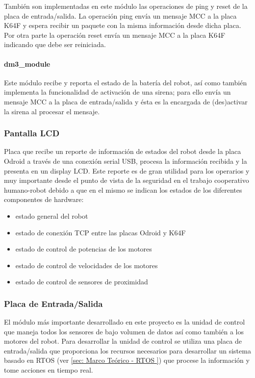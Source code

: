 \documentclass[withindex,glossary]{cam-thesis}
\begin{document}
También son implementadas en este módulo las operaciones de ping y reset de la placa de entrada/salida. La operación ping envía un mensaje MCC a la placa K64F y espera recibir un paquete con la misma información desde dicha placa. Por otra parte la operación reset envía un mensaje MCC a la placa K64F indicando que debe ser reiniciada.

\paragraph{dm3\_module}
Este módulo recibe y reporta el estado de la batería del robot, así como también implementa la funcionalidad de activación de una sirena; para ello envía un mensaje MCC a la placa de entrada/salida y ésta es la encargada de (des)activar la sirena al procesar el mensaje.

\subsubsection{Pantalla LCD}
Placa que recibe un reporte de información de estados del robot desde la placa Odroid a través de una conexión serial USB, procesa la información recibida y la presenta en un display LCD. Este reporte es de gran utilidad para los operarios y muy importante desde el punto de vista de la seguridad en el trabajo cooperativo humano-robot debido a que en el mismo se indican los estados de los diferentes componentes de hardware:
\begin{itemize}
\item estado general del robot
\item estado de conexión TCP entre las placas Odroid y K64F
\item estado de control de potencias de los motores
\item estado de control de velocidades de los motores
\item estado de control de sensores de proximidad
\end{itemize}

\subsubsection{Placa de Entrada/Salida}
El módulo más importante desarrollado en este proyecto es la unidad de control que maneja todos los sensores de bajo volumen de datos así como también a los motores del robot.
Para desarrollar la unidad de control se utiliza una placa de entrada/salida que proporciona los recursos necesarios para desarrollar un sistema basado en RTOS (ver \ref{sec: Marco Teórico - RTOS }) que procese la información y tome acciones en tiempo real.
\end{document}
